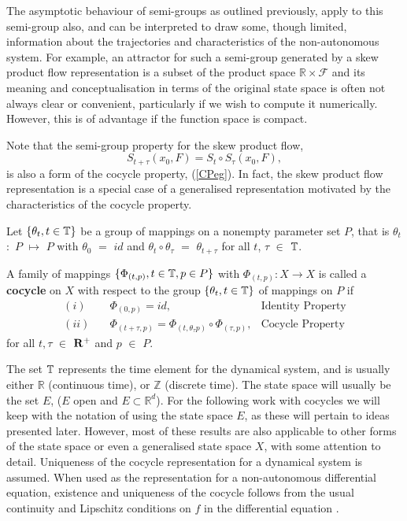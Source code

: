 The asymptotic behaviour of semi-groups as outlined previously,
apply to this semi-group also, and can be interpreted to draw
some, though limited, information about the trajectories and
characteristics of the non-autonomous system. For example, an
attractor for such a semi-group generated by a skew product flow
representation is a subset of the product space $\mathbb{R} \times
\mathcal{F}$ and its meaning and conceptualisation in terms of the
original state space is often not always clear or convenient,
particularly if we wish to compute it numerically. However, this is
of advantage if the function space is compact.

Note that the semi-group property for the skew product flow,
\[ S_{t+\tau}(x_0,F) = S_t \circ S_{\tau}(x_0,F), \]
is also a form of the cocycle property, (\ref{CPeg}).
In fact, the skew product flow representation is a special
case of a generalised representation motivated by the
characteristics of the cocycle property.

\begin{defn} \label{crep}
  Let $\{\theta_{t}, t \in \mathbb{T} \}$ be a group of mappings on a nonempty
parameter set $P$, that is  $\theta_{t}$ $:$ $P$ $\mapsto$ $P$
with $\theta_{0}$ $=$ $id$ and $\theta_{t} \circ \theta_{\tau}$
$=$ $\theta_{t+\tau}$ for all $t$, $\tau$ $\in$ $\mathbb{T}$.

A family of mappings $\{ \Phi_{(t,p)}, t \in \mathbb{T}, p \in P \}$ with
$\Phi_{(t,p)}:X \to X$ is called a {\bf cocycle} on $X$ with
respect to the group $\{\theta_t, t \in \mathbb{T} \}$ of mappings on $P$
if
  \begin{align}
    (i) \quad & \Phi_{(0,p)} = id, \qquad \qquad  & \mbox{Identity Property}
                          \\
    (ii) \quad & \Phi_{(t +\tau, p)} = \Phi_{(t,\theta_{\tau}p)} \circ
         \Phi_{(\tau,p)}, & \mbox{Cocycle Property} \label{CP}
  \end{align}
for all  $t,\tau$ $\in$ ${\bf R}^{+}$ and $p$ $\in$ $P$.
\end{defn}

The set $\mathbb{T}$ represents the time element for the dynamical
system, and is usually either $\mathbb{R}$ (continuous time), or
$\mathbb{Z}$ (discrete time). The state space will usually be the
set $E$, ($E$ open and $E \subset \mathbb{R}^d$). For the
following work with cocycles we will keep with the notation of
using the state space $E$, as these will pertain to ideas
presented later. However, most of these results are also
applicable to other forms of the state space or even a generalised
state space $X$, with some attention to detail. Uniqueness of the
cocycle representation for a dynamical system is assumed. When
used as the representation for a non-autonomous differential
equation, existence and uniqueness of the cocycle follows from the
usual continuity and Lipschitz conditions on $f$ in the
differential equation \cite{Mo62}.

